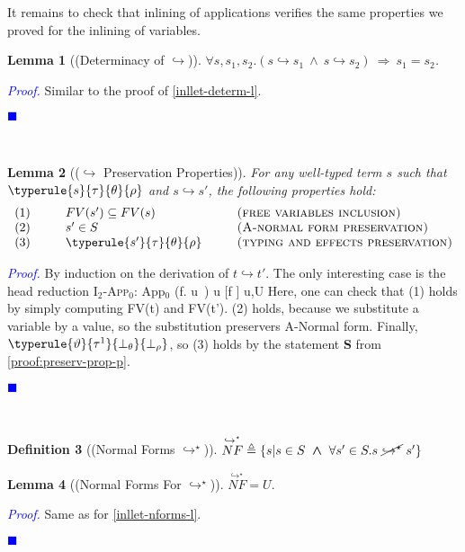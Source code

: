 \documentclass[a4paper,11pt,oneside]{article}
\theoremstyle{plain}
\newtheorem{definition}{Definition}[subsection]
\newtheorem{lemma}[definition]{Lemma}
\renewenvironment{proof}{\noindent \textcolor{blue}{\textit{Proof.}}}
{{\begin{tiny}\textcolor{blue}{$\blacksquare$}\end{tiny}}\\}
\newcommand{\tmsbst}[3]{#1 [#2 \mapsfrom #3] }
\newcommand{\bwedge}{\boldsymbol{~\wedge~}}
\newcommand{\brarr}{\boldsymbol{~\Rightarrow~}}
\newcommand{\bth}{\bot_\theta}
\newcommand{\brh}{\bot_\rho}
\newcommand{\icarr}{\hookrightarrow}
\newcommand{\icarrt}{\icarr^{\star}}
\newcommand{\icNF}{\overset{\icarrt}{NF}}
\newcommand{\ic}[2]{#1 \icarr #2}
\begin{document}
It remains to check that inlining of applications verifies the same properties we proved for the inlining of variables. 

\begin{lemma}[(Determinacy of $\icarr$)] 
	$\forall s, s_1, s_2.
		(s \icarr {s_1} \bwedge s \icarr {s_2}) \brarr
			s_1 = s_2$.	\label{ic-determ-l}	
\end{lemma}
\begin{proof} Similar to the proof of \ref{inllet-determ-l}. \end{proof} 

\begin{lemma}[($\icarr$ Preservation Properties)]
For any well-typed term $s$ such that\\ $\typerule{s}{\tau}{\theta}{\rho}$ and $\ic{s}{s'}$, the following properties hold:
\begin{displaymath}
\begin{array}{l@{\hspace*{1cm}}l@{\hspace*{1cm}}l}
	(1)& FV(s') \subseteq FV(s) & \textsc{(free variables inclusion)} \\
	(2)& s' \in S & \textsc{(A-normal form preservation)}\\ 
	(3)& \typerule{s'}{\tau}{\theta}{\rho} &\textsc{(typing and effects preservation)}
	\end{array}
\end{displaymath}
 \label{ic-prop-l}
\end{lemma}	
\begin{proof}
	By induction on the derivation of $\ic{t}{t'}$. 
	The only interesting case is the head reduction \textsc{I$_2$-App$_0$}:
	\icrulehead
		{App$_0$}
		{(\lambda f. u~\vartheta)}
		{\tmsbst{u}{f}{\vartheta}}
		{u,\vartheta \in U} 
	\vspace*{0.5cm}
	Here, one can check that (1) holds by simply computing  FV(t) and FV(t').
	(2) holds, because we substitute a variable by a value, so the substitution preservers A-Normal form.
	Finally, $\typerule{\vartheta}{\tau^1}{\bth}{\brh}$, so (3) holds by the statement \textbf{S} from \cref{proof:preserv-prop-p}. 
 \end{proof}
 
 \begin{definition}[(Normal Forms $\icarrt$)]
 $ \icNF \triangleq \{ s | s \in S \bwedge 
 \forall s' \in S. s~\cancel{\icarrt}~s' \} $
\end{definition}

\begin{lemma}[(Normal Forms For $\icarrt$)] 
$ \icNF  = U.$
\label{ic-nforms-l}
\end{lemma}
\begin{proof} Same as for \cref{inllet-nforms-l}.
\end{proof}
\end{document}
